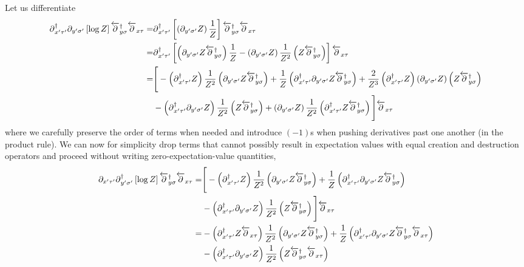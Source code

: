 Let us differentiate
\begin{align}
	\partial{}^{\dagger}_{x'\tau'} \partial_{y'\sigma'} \left[\log Z\right] \overleftarrow{\partial}{}^{\dagger}_{y\sigma} \overleftarrow{\partial}_{x\tau}
	=&
	\partial{}^{\dagger}_{x'\tau'} \left[\left(\partial_{y'\sigma'} Z\right) \frac{1}{Z} \right] \overleftarrow{\partial}{}^{\dagger}_{y\sigma} \overleftarrow{\partial}_{x\tau}
	\nonumber\\
	=&
	\partial{}^{\dagger}_{x'\tau'} \left[
		\left(\partial_{y'\sigma'} Z \overleftarrow{\partial}{}^{\dagger}_{y\sigma}\right)\frac{1}{Z}
	-	\left( \partial_{y'\sigma'} Z\right) \frac{1}{Z^2} \left( Z \overleftarrow{\partial}{}^{\dagger}_{y\sigma} \right)
	\right] \overleftarrow{\partial}_{x\tau}
	\nonumber\\
	=&
	\Bigg[
	-	\left(\partial{}^{\dagger}_{x'\tau'} Z \right) \frac{1}{Z^2} \left(\partial_{y'\sigma'} Z \overleftarrow{\partial}{}^{\dagger}_{y\sigma}\right)
	+	\frac{1}{Z} \left(\partial{}^{\dagger}_{x'\tau'} \partial_{y'\sigma'} Z \overleftarrow{\partial}{}^{\dagger}_{y\sigma}\right)
	+	\frac{2}{Z^3} \left( \partial{}^{\dagger}_{x'\tau'} Z\right) \left(\partial_{y'\sigma'}Z \right)\left( Z \overleftarrow{\partial}{}^{\dagger}_{y\sigma} \right)
	\nonumber\\
	&
	-	\left(\partial{}^{\dagger}_{x'\tau'} \partial_{y'\sigma'} Z\right)\frac{1}{Z^2}\left(Z \overleftarrow{\partial}{}^{\dagger}_{y\sigma}\right)
	+	\left( \partial_{y'\sigma'} Z\right) \frac{1}{Z^2} \left( \partial{}^{\dagger}_{x'\tau'} Z \overleftarrow{\partial}{}^{\dagger}_{y\sigma} \right)
	\Bigg] \overleftarrow{\partial}_{x\tau}
\end{align}
where we carefully preserve the order of terms when needed and introduce $(-1)$s when pushing derivatives past one another (in the product rule).
We can now for simplicity drop terms that cannot possibly result in expectation values with equal creation and destruction operators and proceed without writing zero-expectation-value quantities,
\begin{align}
	\partial_{x'\tau'} \partial{}^{\dagger}_{y'\sigma'} \left[\log Z\right] \overleftarrow{\partial}{}^{\dagger}_{y\sigma} \overleftarrow{\partial}_{x\tau}
	=&
	\Bigg[
	-	\left(\partial{}^{\dagger}_{x'\tau'} Z \right) \frac{1}{Z^2} \left(\partial_{y'\sigma'} Z \overleftarrow{\partial}{}^{\dagger}_{y\sigma}\right)
	+	\frac{1}{Z} \left(\partial{}^{\dagger}_{x'\tau'} \partial_{y'\sigma'} Z \overleftarrow{\partial}{}^{\dagger}_{y\sigma}\right)
	\nonumber\\
	&
	-	\left(\partial{}^{\dagger}_{x'\tau'} \partial_{y'\sigma'} Z\right)\frac{1}{Z^2}\left(Z \overleftarrow{\partial}{}^{\dagger}_{y\sigma}\right)
	\Bigg] \overleftarrow{\partial}_{x\tau}
	\nonumber\\
	=&
	-	\left(\partial{}^{\dagger}_{x'\tau'} Z \overleftarrow{\partial}_{x\tau}\right) \frac{1}{Z^2} \left(\partial_{y'\sigma'} Z \overleftarrow{\partial}{}^{\dagger}_{y\sigma}\right)
	+	\frac{1}{Z} \left(\partial{}^{\dagger}_{x'\tau'} \partial_{y'\sigma'} Z \overleftarrow{\partial}{}^{\dagger}_{y\sigma}\overleftarrow{\partial}_{x\tau}\right)
	\nonumber\\
	&
	-	\left(\partial{}^{\dagger}_{x'\tau'} \partial_{y'\sigma'} Z\right)\frac{1}{Z^2}\left(Z \overleftarrow{\partial}{}^{\dagger}_{y\sigma}\overleftarrow{\partial}_{x\tau}\right)
\end{align}
